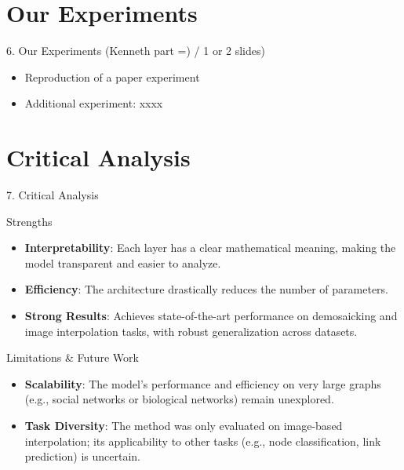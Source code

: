 \documentclass[aspectratio=169,xcolor=dvipsnames]{beamer}
\begin{document}
\section{Our Experiments} %

\begin{frame}{6. Our Experiments (Kenneth part =) / 1 or 2 slides)}
    \begin{itemize}
        \item Reproduction of a paper experiment
        \item Additional experiment: xxxx
    \end{itemize}
\end{frame}

\section{Critical Analysis}

\begin{frame}{7. Critical Analysis}

    \begin{exampleblock}{Strengths}
        \begin{itemize}
            \item \textbf{Interpretability}: Each layer has a clear mathematical meaning, making the model transparent and easier to analyze.
            
            \item \textbf{Efficiency}: The architecture drastically reduces the number of parameters.
            
            \item \textbf{Strong Results}: Achieves state-of-the-art performance on demosaicking and image interpolation tasks, with robust generalization across datasets.
        \end{itemize}
    \end{exampleblock}

    \begin{alertblock}{Limitations \& Future Work}
        \begin{itemize}
            \item \textbf{Scalability}: The model’s performance and efficiency on very large graphs (e.g., social networks or biological networks) remain unexplored.
            
            \item \textbf{Task Diversity}: The method was only evaluated on image-based interpolation; its applicability to other tasks (e.g., node classification, link prediction) is uncertain.
            
        \end{itemize}
    \end{alertblock}

\end{frame}
\end{document}
